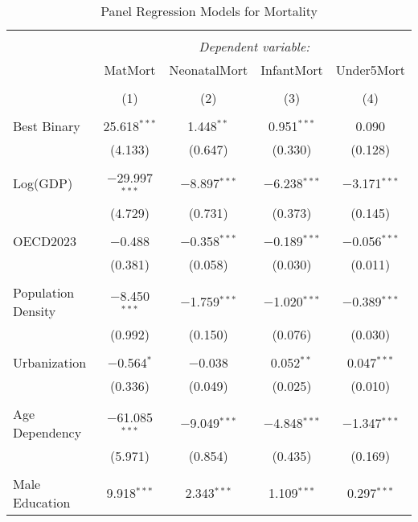 
\begin{table}[!htbp] \centering 
  \caption{Panel Regression Models for Mortality} 
  \label{} 
\begin{tabular}{@{\extracolsep{5pt}}lcccc} 
\\[-1.8ex]\hline 
\hline \\[-1.8ex] 
 & \multicolumn{4}{c}{\textit{Dependent variable:}} \\ 
\cline{2-5} 
 & MatMort & NeonatalMort & InfantMort & Under5Mort \\ 
\\[-1.8ex] & (1) & (2) & (3) & (4)\\ 
\hline \\[-1.8ex] 
 Best Binary & 25.618$^{***}$ & 1.448$^{**}$ & 0.951$^{***}$ & 0.090 \\ 
  & (4.133) & (0.647) & (0.330) & (0.128) \\ 
  & & & & \\ 
 Log(GDP) & $-$29.997$^{***}$ & $-$8.897$^{***}$ & $-$6.238$^{***}$ & $-$3.171$^{***}$ \\ 
  & (4.729) & (0.731) & (0.373) & (0.145) \\ 
  & & & & \\ 
 OECD2023 & $-$0.488 & $-$0.358$^{***}$ & $-$0.189$^{***}$ & $-$0.056$^{***}$ \\ 
  & (0.381) & (0.058) & (0.030) & (0.011) \\ 
  & & & & \\ 
 Population Density & $-$8.450$^{***}$ & $-$1.759$^{***}$ & $-$1.020$^{***}$ & $-$0.389$^{***}$ \\ 
  & (0.992) & (0.150) & (0.076) & (0.030) \\ 
  & & & & \\ 
 Urbanization & $-$0.564$^{*}$ & $-$0.038 & 0.052$^{**}$ & 0.047$^{***}$ \\ 
  & (0.336) & (0.049) & (0.025) & (0.010) \\ 
  & & & & \\ 
 Age Dependency & $-$61.085$^{***}$ & $-$9.049$^{***}$ & $-$4.848$^{***}$ & $-$1.347$^{***}$ \\ 
  & (5.971) & (0.854) & (0.435) & (0.169) \\ 
  & & & & \\ 
 Male Education & 9.918$^{***}$ & 2.343$^{***}$ & 1.109$^{***}$ & 0.297$^{***}$ \\ 

\end{tabular}
\end{table}
